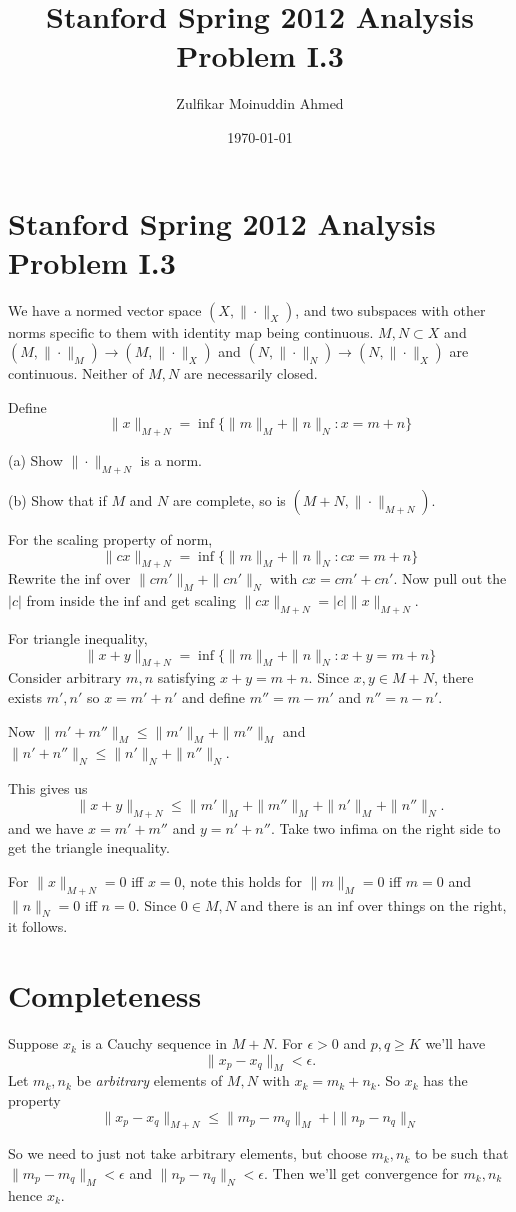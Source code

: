 \documentclass{amsart}
\title{Stanford Spring 2012 Analysis Problem I.3}
\author{Zulfikar Moinuddin Ahmed}
\date{\today}
\begin{document}
\maketitle

\section{Stanford Spring 2012 Analysis Problem I.3}

We have a normed vector space $(X, \|\cdot\|_X)$, and two subspaces with other norms specific to them with identity map being continuous.  $M, N\subset X$ and $(M,\|\cdot\|_M) \rightarrow (M, \| \cdot \|_X)$ and $(N,\|\cdot\|_N) \rightarrow (N, \| \cdot \|_X)$  are continuous.  Neither of $M,N$ are necessarily closed.

Define
\[
\|x\|_{M+N} = \inf\{ \|m\|_M + \|n\|_N: x=m+n\}
\]

(a) Show $\|\cdot\|_{M+N}$ is a norm.

(b) Show that if $M$ and $N$ are complete, so is $(M+N,\|\cdot\|_{M+N})$.

For the scaling property of norm,
\[
\|c x\|_{M+N} = \inf \{\| m \|_M + \| n\|_N: cx = m+n \}
\]
Rewrite the inf over $\| c m' \|_M + \| c n' \|_N$ with $cx=cm' + cn'$.  Now pull out the $|c|$ from inside the inf and get scaling $\| cx \|_{M+N} = |c| \| x \|_{M+N}$.

For triangle inequality,
\[
\| x + y \|_{M+N} =\inf\{ \|m\|_M + \|n\|_N: x+y = m +n \}
\]
Consider arbitrary $m,n$ satisfying $x+y=m+n$.
Since $x,y \in M+N$, there exists $m',n'$ so $x=m'+n'$ and define $m''=m-m'$ and $n''=n-n'$.  

Now $\| m' + m'' \|_M \le \| m' \|_M + \|m''\|_M$ and $\| n' + n'' \|_N \le \|n' \|_N + \| n'' \|_N$.

This gives us
\[
\| x + y \|_{M+N} \le \| m' \|_M + \|m''\|_M + \| n' \|_M + \| n'' \|_N.
\]
and we have $x=m'+m''$ and $y=n'+n''$.  Take two infima on the right side to get the triangle inequality.

For $\|x\|_{M+N}=0$ iff $x=0$, note this holds for $\| m\|_M=0$ iff $m=0$ and $\|n\|_N=0$ iff $n=0$.  Since $0 \in M, N$ and there is an inf over things on the right, it follows.


\section{Completeness}

Suppose $x_k$ is a Cauchy sequence in $M+N$.  For $\epsilon>0$ and $p,q \ge K$ we'll have
\[
\| x_p - x_q \|_{M} < \epsilon.
\]
Let $m_k,n_k$ be {\em arbitrary} elements of $M,N$ with $x_k = m_k + n_k$.
So $x_k$ has the property
\[
\| x_p - x_q\|_{M+N} \le \|m_p - m_q\|_M + |\|n_p - n_q\|_N
\]

So we need to just not take arbitrary elements, but choose $m_k,n_k$ to be such that $\|m_p-m_q\|_M < \epsilon$ and $\|n_p-n_q\|_N <\epsilon$.  Then we'll get convergence for $m_k,n_k$ hence $x_k$.
\end{document}
